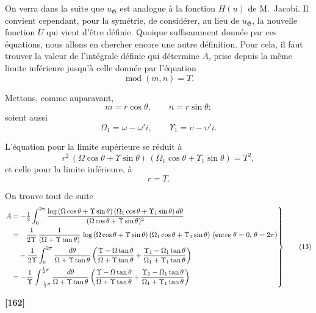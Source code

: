 \documentclass[11pt,a4paper]{article}
\DeclareMathOperator{\modd}{mod}
\begin{document}
On verra dans la suite que $u_{\mathfrak{G}}$ est analogue \`a la fonction $H(u)$ de M.~Jacobi. Il
convient cependant, pour la sym\'etrie, de consid\'erer, au lieu de $u_{\mathfrak{G}}$, la nouvelle fonction
$U$ qui vient d'\^etre d\'efinie. Quoique suffisamment donn\'ee par ces \'equations, nous
allons en chercher encore une autre d\'efinition. Pour cela, il faut trouver la valeur
de l'int\'egrale d\'efinie qui d\'etermine $A$, prise depuis la m\^eme limite inf\'erieure jusqu'\`a
celle donn\'ee par l'\'equation
\[\modd(m, n) = T.\]

Mettons, comme auparavant,
\[m = r\cos\theta,\qquad n = r\sin\theta;\]
soient aussi
\[\Omega_1 = \omega - \omega'i,\qquad \Upsilon_1 = \upsilon - \upsilon'i.\]

L'\'equation pour la limite sup\'erieure se r\'eduit \`a
\[r^2\, (\Omega\cos\theta + \Upsilon\sin\theta)\, (\Omega_1\cos\theta + \Upsilon_1\sin\theta) = T^2,\]
et celle pour la limite inf\'erieure, \`a
\[r = T.\]

On trouve tout de suite
\begin{equation}
\left.
\begin{aligned}
A &= -\tfrac{1}{2} \int_0^{2\pi} \frac{\log\, (\Omega\cos\theta + \Upsilon\sin\theta)\, (\Omega_1\cos\theta + \Upsilon_1\sin\theta)\, d\theta}{(\Omega\cos\theta + \Upsilon\sin\theta)^2}\\
&= \hphantom{-}\frac{1}{2\Upsilon}\, \frac{1}{(\Omega + \Upsilon\tan\theta)}\, \log\, (\Omega\cos\theta + \Upsilon\sin\theta)\, (\Omega_1\cos\theta + \Upsilon_1\sin\theta)\ \text{(entre $\theta = 0$, $\theta = 2\pi$)}\\
&\quad - \frac{1}{2\Upsilon} \int_0^{2\pi} \frac{d\theta}{\Omega + \Upsilon\tan\theta}\left(\frac{\Upsilon - \Omega\tan\theta}{\Omega + \Upsilon\tan\theta} + \frac{\Upsilon_1 - \Omega_1\tan\theta}{\Omega_1 + \Upsilon_1\tan\theta}\right)\\
&= -\frac{1}{\Upsilon} \int_{-\frac{1}{2}\pi}^{\frac{1}{2}\pi} \frac{d\theta}{\Omega + \Upsilon\tan\theta}\left(\frac{\Upsilon - \Omega\tan\theta}{\Omega + \Upsilon\tan\theta} + \frac{\Upsilon_1 - \Omega_1\tan\theta}{\Omega_1 + \Upsilon_1\tan\theta}\right)
\end{aligned}
\right\} \tag{13}
\end{equation}

\textbf{[162]}
\end{document}
